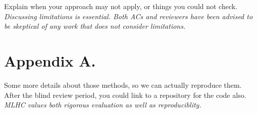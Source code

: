 \documentclass[pmlr]{jmlr}%
\begin{document}
Explain when your approach may not apply, or things you could not
check.  \emph{Discussing limitations is essential.  Both ACs and
  reviewers have been advised to be skeptical of any work that does
  not consider limitations.}




\newpage
\appendix
\section*{Appendix A.}

Some more details about those methods, so we can actually reproduce
them.  After the blind review period, you could link to a repository
for the code also.  \emph{MLHC values both rigorous evaluation as well
  as reproduciblity.}
\end{document}
